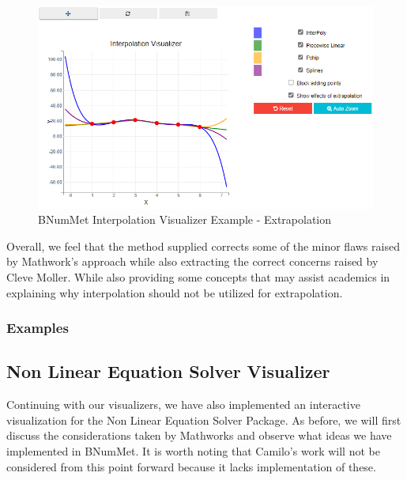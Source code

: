 \begin{figure}[H]
    \centering
    \includegraphics[width=\textwidth]{Include/Images/Thesis/Development/Visualizers/INTERPOLATION VISUALIZER/BNumMet.Interpolation.Ex1.2.png}
    \caption{BNumMet Interpolation Visualizer Example - Extrapolation}
    \label{fig:BNumMet Interpolation Visualizer Example - Extrapolation}
\end{figure}

Overall, we feel that the method supplied corrects some of the minor flaws raised by Mathwork's approach while also extracting the correct concerns raised by Cleve Moller. While also providing some concepts that may assist academics in explaining why interpolation should not be utilized for extrapolation. 
\subsubsection{Examples}
	

\subsection{Non Linear Equation Solver Visualizer}
Continuing with our visualizers, we have also implemented an interactive visualization for the Non Linear Equation Solver Package. As before, we will first discuss the considerations taken by Mathworks and observe what ideas we have implemented in BNumMet. It is worth noting that Camilo's work will not be considered from this point forward because it lacks implementation of these.

